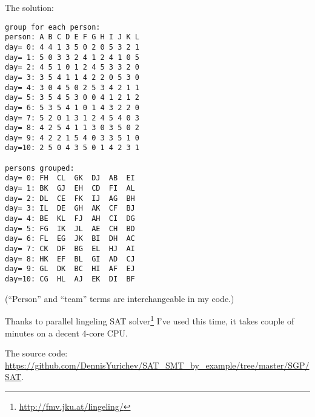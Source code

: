 The solution:

\begin{lstlisting}
group for each person:
person: A B C D E F G H I J K L
day= 0: 4 4 1 3 5 0 2 0 5 3 2 1
day= 1: 5 0 3 3 2 4 1 2 4 1 0 5
day= 2: 4 5 1 0 1 2 4 5 3 3 2 0
day= 3: 3 5 4 1 1 4 2 2 0 5 3 0
day= 4: 3 0 4 5 0 2 5 3 4 2 1 1
day= 5: 3 5 4 5 3 0 0 4 1 2 1 2
day= 6: 5 3 5 4 1 0 1 4 3 2 2 0
day= 7: 5 2 0 1 3 1 2 4 5 4 0 3
day= 8: 4 2 5 4 1 1 3 0 3 5 0 2
day= 9: 4 2 2 1 5 4 0 3 3 5 1 0
day=10: 2 5 0 4 3 5 0 1 4 2 3 1

persons grouped:
day= 0: FH  CL  GK  DJ  AB  EI
day= 1: BK  GJ  EH  CD  FI  AL
day= 2: DL  CE  FK  IJ  AG  BH
day= 3: IL  DE  GH  AK  CF  BJ
day= 4: BE  KL  FJ  AH  CI  DG
day= 5: FG  IK  JL  AE  CH  BD
day= 6: FL  EG  JK  BI  DH  AC
day= 7: CK  DF  BG  EL  HJ  AI
day= 8: HK  EF  BL  GI  AD  CJ
day= 9: GL  DK  BC  HI  AF  EJ
day=10: CG  HL  AJ  EK  DI  BF
\end{lstlisting}

(``Person'' and ``team'' terms are interchangeable in my code.)

Thanks to 
parallel lingeling SAT solver\footnote{\url{http://fmv.jku.at/lingeling/}}
I've used this time, it takes couple of minutes on a decent 4-core CPU.

The source code: \url{https://github.com/DennisYurichev/SAT_SMT_by_example/tree/master/SGP/SAT}.

